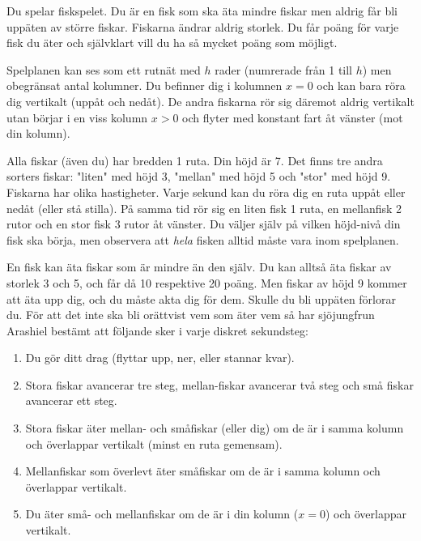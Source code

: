 
Du spelar fiskspelet. Du är en fisk som ska äta mindre fiskar men aldrig får
bli uppäten av större fiskar. Fiskarna ändrar aldrig storlek. Du får poäng för varje fisk du äter och självklart vill du ha så mycket
poäng som möjligt.

Spelplanen kan ses som ett rutnät med $h$ rader (numrerade från 1 till $h$) men obegränsat antal kolumner. Du befinner dig i kolumnen $x=0$ och kan bara röra dig vertikalt (uppåt och nedåt). De andra fiskarna rör sig däremot aldrig vertikalt utan börjar i en viss kolumn $x>0$ och flyter med konstant fart åt vänster (mot din kolumn). 

Alla fiskar (även du) har bredden 1 ruta. Din höjd är 7. Det finns tre andra sorters fiskar: "liten" med höjd 3, "mellan" med höjd 5 och "stor" med höjd 9. Fiskarna har olika hastigheter. Varje sekund kan du röra dig en ruta uppåt eller nedåt (eller stå stilla). På samma tid rör sig en liten fisk 1 ruta, en mellanfisk 2 rutor och en stor fisk 3 rutor åt vänster. Du väljer själv på vilken höjd-nivå din fisk ska börja, men observera att \emph{hela} fisken alltid måste vara inom spelplanen. 


En fisk kan äta fiskar som är mindre än den själv. Du kan alltså äta fiskar av storlek 3 och 5, och får då 10 respektive 20 poäng. Men fiskar av höjd 9 kommer att äta upp dig, och du måste akta dig för dem. Skulle du bli uppäten förlorar du. För att det inte ska bli orättvist vem som
äter vem så har sjöjungfrun Arashiel bestämt att följande sker i varje diskret
sekundsteg:

\begin{enumerate}
  \item
     Du gör ditt drag (flyttar upp, ner, eller stannar kvar).
  \item
     Stora fiskar avancerar tre steg, mellan-fiskar avancerar två steg och små fiskar avancerar ett steg.
  \item
     Stora fiskar äter mellan- och småfiskar (eller dig) om de är i samma kolumn och överlappar vertikalt (minst en ruta gemensam).
  \item
     Mellanfiskar som överlevt äter småfiskar om de är i samma kolumn och överlappar vertikalt.
  \item
     Du äter små- och mellanfiskar om de är i din kolumn ($x=0$) och överlappar vertikalt.
\end{enumerate}


